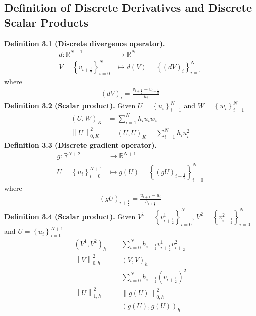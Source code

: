 \documentclass[a4paper]{article}
\numberwithin{equation}{section}
\begin{document}
\subsection{Definition of Discrete Derivatives and Discrete Scalar Products}
\textbf{Definition 3.1 (Discrete divergence operator).} 
\begin{align}
d:{\mathbb{R}^{N + 1}} &\to {\mathbb{R}^N}\\
V=\left\{ {{v_{i + \frac{1}{2}}}} \right\}_{i = 0}^N &\mapsto d\left(V\right)=\left\{ {{{\left( {dV} \right)}_i}} \right\}_{i = 1}^N
\end{align}
where
\begin{align}
{\left( {dV} \right)_i} = \frac{{{v_{i + \frac{1}{2}}} - {v_{i - \frac{1}{2}}}}}{{{h_i}}}
\end{align}
\textbf{Definition 3.2 (Scalar product).} Given $U=\left\{ {{u_i}} \right\}_{i = 1}^N$ and $W=\left\{ {{w_i}} \right\}_{i = 1}^N$ 
\begin{align}
{\left( U,W \right)_K} &= \sum\limits_{i = 1}^N {{h_i}{u_i}{w_i}} \\
\left\| U \right\|_{0,K}^2 &= {\left( U,U \right)_K} = \sum\limits_{i = 1}^N {{h_i}u_i^2} 
\end{align}
\textbf{Definition 3.3 (Discrete gradient operator).} 
\begin{align}
g:{\mathbb{R}^{N + 2}} &\to {\mathbb{R}^{N + 1}}\\
U=\left\{ {{u_i}} \right\}_{i = 0}^{N + 1} &\mapsto g\left(U\right) = \left\{ {{{\left( gU \right)}_{i + \frac{1}{2}}}} \right\}_{i = 0}^N
\end{align}
where
\begin{align}
{\left( {gU} \right)_{i + \frac{1}{2}}} = \frac{{{u_{i + 1}} - {u_i}}}{{{h_{i + \frac{1}{2}}}}}
\end{align}
\textbf{Definition 3.4 (Scalar product).} Given $V^1=\left\{ {v_{i + \frac{1}{2}}^1} \right\}_{i = 0}^N$, $V^2=\left\{ {v_{i + \frac{1}{2}}^2} \right\}_{i = 0}^N$  and $U=\left\{ {{u_i}} \right\}_{i = 0}^{N + 1}$
\begin{align}
{\left( {{V^1},{V^2}} \right)_h} &= \sum\limits_{i = 0}^N {{h_{i + \frac{1}{2}}}v_{i + \frac{1}{2}}^1v_{i + \frac{1}{2}}^2} \\
\left\| V \right\|_{0,h}^2 &= {\left( V,V \right)_h}\label{3.10}\\
& = \sum\limits_{i = 0}^N {{h_{i + \frac{1}{2}}}{{\left( {{v_{i + \frac{1}{2}}}} \right)}^2}} \\
\left\| U \right\|_{1,h}^2 &= \left\| {g\left( U \right)} \right\|_{0,h}^2\\
 &= {\left( {g\left( U \right),g\left( U \right)} \right)_h} \label{3.13}
\end{align}
\end{document}
